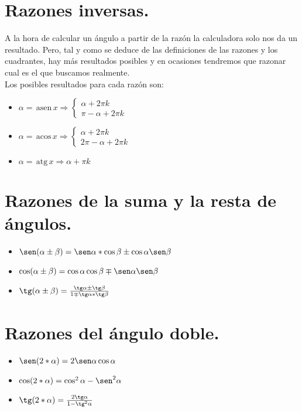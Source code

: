 \documentclass[a4paper,9pt,answers]{exam}
\newcommand{\asen}{\,\mathrm{asen}\,}
\newcommand{\acos}{\,\mathrm{acos}\,}
\newcommand{\atg}{\,\mathrm{atg}\,}
\begin{document}
\section{Razones inversas.}
A la hora de calcular un ángulo a partir de la razón la calculadora solo nos da un resultado. Pero, tal y como se deduce de las definiciones de las razones y los cuadrantes, hay más resultados posibles y en ocasiones tendremos que razonar cual es el que buscamos realmente.\\
Los posibles resultados para cada razón son:
\begin{itemize}
	\item $\alpha = \asen x \Rightarrow \left\lbrace\begin{array}{l}
		\alpha + 2\pi k\\
		\pi - \alpha + 2\pi k
	\end{array}\right.$
	\item $\alpha = \acos x \Rightarrow \left\lbrace\begin{array}{l}
		\alpha + 2\pi k\\
		2\pi - \alpha + 2\pi k
	\end{array}\right.$
	\item $\alpha = \atg x \Rightarrow \alpha + \pi k$
\end{itemize}

\section{Razones de la suma y la resta de ángulos.}
\begin{itemize}
	\item $\sen (\alpha \pm \beta) = \sen \alpha *\cos \beta \pm \cos \alpha\sen\beta$
	\item $\cos (\alpha \pm \beta) = \cos \alpha \cos \beta \mp \sen \alpha\sen \beta$
	\item $\tg (\alpha \pm \beta) = \frac{\tg \alpha \pm \tg \beta}{1\mp \tg \alpha*\tg \beta}$
\end{itemize}

\section{Razones del ángulo doble.}
\begin{itemize}
	\item $\sen (2*\alpha) = 2\sen \alpha\cos \alpha$
	\item $\cos (2*\alpha) = \cos^2 \alpha - \sen^2 \alpha$
	\item $\tg (2*\alpha) = \frac{2\tg \alpha}{1 - \tg^2 \alpha}$
\end{itemize}
\end{document}
